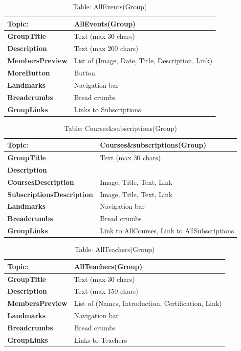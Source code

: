 \begin{table}[H]
\centering
\begin{tabularx}{\textwidth}{|>{\bfseries}l|X|}
\hline
Topic: & \textbf{AllEvents(Group)} \\
\hline
GroupTitle & Text (max 30 chars) \\
\hline
Description & Text (max 200 chars) \\
\hline
MembersPreview & List of (Image, Date, Title, Description, Link) \\
\hline
MoreButton & Button \\
\hline
Landmarks & Navigation bar \\
\hline
Breadcrumbs & Bread crumbs \\
\hline
GroupLinks & Links to Subscriptions \\
\hline
\end{tabularx}
\caption{Table: AllEvents(Group)}
\end{table}

\begin{table}[H]
\centering
\begin{tabularx}{\textwidth}{|>{\bfseries}l|X|}
\hline
Topic: & \textbf{Courses\&subscriptions(Group)} \\
\hline
GroupTitle & Text (max 30 chars) \\
\hline
Description &  \\
\hline
CoursesDescription & Image, Title, Text, Link \\
\hline
SubscriptionsDescription & Image, Title, Text, Link \\
\hline
Landmarks & Navigation bar \\
\hline
Breadcrumbs & Bread crumbs \\
\hline
GroupLinks & Link to AllCourses, Link to AllSubscriptions \\
\hline
\end{tabularx}
\caption{Table: Courses\&subscriptions(Group)}
\end{table}

\begin{table}[H]
\centering
\begin{tabularx}{\textwidth}{|>{\bfseries}l|X|}
\hline
Topic: & \textbf{AllTeachers(Group)} \\
\hline
GroupTitle & Text (max 30 chars) \\
\hline
Description & Text (max 150 chars) \\
\hline
MembersPreview & List of (Names, Introduction, Certification, Link) \\
\hline
Landmarks & Navigation bar \\
\hline
Breadcrumbs & Bread crumbs \\
\hline
GroupLinks & Links to Teachers \\
\hline
\end{tabularx}
\caption{Table: AllTeachers(Group)}
\end{table}

